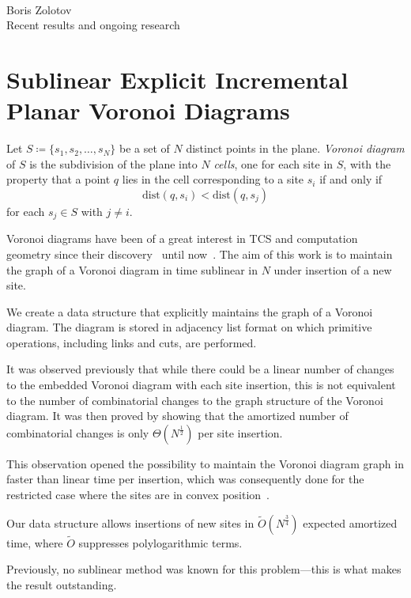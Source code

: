 \documentclass[a4paper,11pt]{article}
\theoremstyle{definition}
\begin{document}
\def\P{\mathcal P} \def\Ot{\tilde O}

\begin{center} \ \\ [1.5cm]
	{\Huge Boris Zolotov} \\ [0.35cm]
	{Recent results and ongoing research}
\end{center}

\section{Sublinear Explicit Incremental Planar Voronoi Diagrams}

	Let $S \coloneqq \{s_1, s_2, \ldots, s_N\}$ be a set of $N$ distinct points in the plane. \emph{Voronoi diagram} of $S$ is the subdivision of the plane into $N$ \emph{cells}, one for each site in $S$, with the property that a point $q$ lies in the cell corresponding to a site $s_i$ if and only if
	$$\mathrm{dist} (q, s_i) < \mathrm{dist} (q, s_j)$$
	for each $s_j \in S$ with $j \ne i$.

Voronoi diagrams have been of a great interest in TCS and computation geometry since their discovery~\cite{v-vd} until now~\cite{vd-new}. The aim of this work is to maintain the graph of a Voronoi diagram in time sublinear in $N$ under insertion of a new site.

We create a data structure that explicitly maintains the graph of a Voronoi diagram. The diagram is stored in adjacency list format on which primitive operations, including links and cuts, are performed.

It was observed previously that while there could be a linear number of changes to the embedded Voronoi diagram with each site insertion, this is not equivalent to the number of combinatorial changes to the graph structure of the Voronoi diagram.
It was then proved by showing that the amortized number of combinatorial changes is only $\Theta(N^{\frac 12})$ per site insertion.

This observation opened the possibility to maintain the Voronoi diagram graph in faster than linear time per insertion, which was consequently done for the restricted case where the sites are in convex position~\cite{incremental-vd}.

Our data structure allows insertions of new sites in $\Ot (N^{\frac 34})$ expected amortized time, where $\Ot$ suppresses polylogarithmic terms. 

Previously, no sublinear method was known for this problem—this is what makes the result outstanding.
\end{document}
